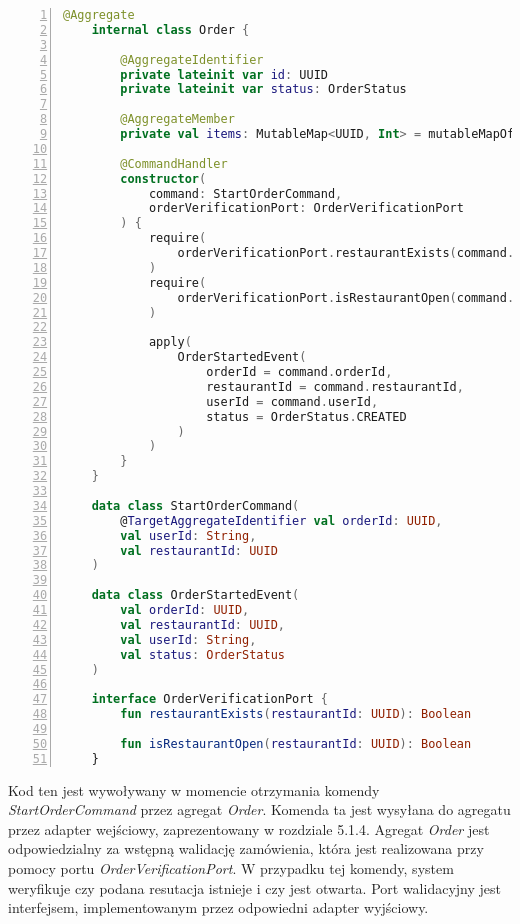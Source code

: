 \begin{lstlisting}[caption={Kod komponentów odpowiedzialnych za rozpoczynanie zamówień},label={lst:server-domain},captionpos=b,language=Kotlin,numbers=left]
    @Aggregate
    internal class Order {
    
        @AggregateIdentifier
        private lateinit var id: UUID
        private lateinit var status: OrderStatus
    
        @AggregateMember
        private val items: MutableMap<UUID, Int> = mutableMapOf()
    
        @CommandHandler
        constructor(
            command: StartOrderCommand,
            orderVerificationPort: OrderVerificationPort
        ) {
            require(
                orderVerificationPort.restaurantExists(command.restaurantId)
            )
            require(
                orderVerificationPort.isRestaurantOpen(command.restaurantId)
            )
    
            apply(
                OrderStartedEvent(
                    orderId = command.orderId,
                    restaurantId = command.restaurantId,
                    userId = command.userId,
                    status = OrderStatus.CREATED
                )
            )
        }
    }

    data class StartOrderCommand(
        @TargetAggregateIdentifier val orderId: UUID,
        val userId: String,
        val restaurantId: UUID
    )

    data class OrderStartedEvent(
        val orderId: UUID,
        val restaurantId: UUID,
        val userId: String,
        val status: OrderStatus
    )

    interface OrderVerificationPort {
        fun restaurantExists(restaurantId: UUID): Boolean

        fun isRestaurantOpen(restaurantId: UUID): Boolean
    }
\end{lstlisting}

Kod ten jest wywoływany w momencie otrzymania komendy \textit{StartOrderCommand} przez agregat \textit{Order}. Komenda ta jest wysyłana do agregatu przez adapter wejściowy, zaprezentowany w rozdziale 5.1.4. Agregat \textit{Order} jest odpowiedzialny za wstępną walidację zamówienia, która jest realizowana przy pomocy portu \textit{OrderVerificationPort}. W przypadku tej komendy, system weryfikuje czy podana resutacja istnieje i czy jest otwarta. Port walidacyjny jest interfejsem, implementowanym przez odpowiedni adapter wyjściowy.

